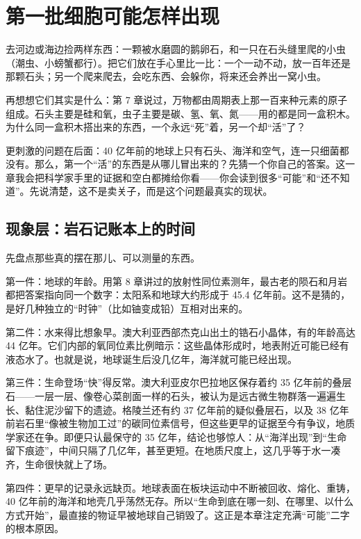 \chapter{第一批细胞可能怎样出现}

\begin{kaichang}
去河边或海边捡两样东西：一颗被水磨圆的鹅卵石，和一只在石头缝里爬的小虫（潮虫、小螃蟹都行）。把它们放在手心里比一比：一个一动不动，放一百年还是那颗石头；另一个爬来爬去，会吃东西、会躲你，将来还会养出一窝小虫。

再想想它们其实是什么：第 7 章说过，万物都由周期表上那一百来种元素的原子组成。石头主要是硅和氧，虫子主要是碳、氢、氧、氮——用的都是同一盒积木。为什么同一盒积木搭出来的东西，一个永远“死”着，另一个却“活”了？

更刺激的问题在后面：40 亿年前的地球上只有石头、海洋和空气，连一只细菌都没有。那么，第一个“活”的东西是从哪儿冒出来的？先猜一个你自己的答案。这一章我会把科学家手里的证据和空白都摊给你看——你会读到很多“可能”和“还不知道”。先说清楚，这不是卖关子，而是这个问题最真实的现状。
\end{kaichang}

\section{现象层：岩石记账本上的时间}

先盘点那些真的摆在那儿、可以测量的东西。

第一件：地球的年龄。用第 8 章讲过的放射性同位素测年，最古老的陨石和月岩都把答案指向同一个数字：太阳系和地球大约形成于 45.4 亿年前。这不是猜的，是好几种独立的“时钟”（比如铀变成铅）互相对出来的。

第二件：水来得比想象早。澳大利亚西部杰克山出土的锆石小晶体，有的年龄高达 44 亿年。它们内部的氧同位素比例暗示：这些晶体形成时，地表附近可能已经有液态水了。也就是说，地球诞生后没几亿年，海洋就可能已经出现。

第三件：生命登场“快”得反常。澳大利亚皮尔巴拉地区保存着约 35 亿年前的叠层石——一层一层、像卷心菜剖面一样的石头，被认为是远古微生物群落一遍遍生长、黏住泥沙留下的遗迹。格陵兰还有约 37 亿年前的疑似叠层石，以及 38 亿年前岩石里“像被生物加工过”的碳同位素信号，但这些更早的证据至今有争议，地质学家还在争。即便只认最保守的 35 亿年，结论也够惊人：从“海洋出现”到“生命留下痕迹”，中间只隔了几亿年，甚至更短。在地质尺度上，这几乎等于水一凑齐，生命很快就上了场。

第四件：更早的记录永远缺页。地球表面在板块运动中不断被回收、熔化、重铸，40 亿年前的海洋和地壳几乎荡然无存。所以“生命到底在哪一刻、在哪里、以什么方式开始”，最直接的物证早被地球自己销毁了。这正是本章注定充满“可能”二字的根本原因。

